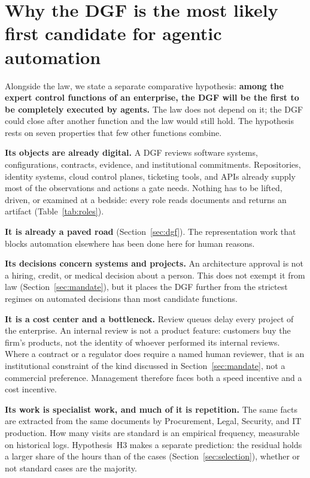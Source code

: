 \section{Why the DGF is the most likely first candidate for agentic automation}
\label{sec:candidate}

Alongside the law, we state a separate comparative hypothesis: \textbf{among the expert control
functions of an enterprise, the DGF will be the first to be completely executed by agents.} The law
does not depend on it; the DGF could close after another function and the law would still hold. The
hypothesis rests on seven properties that few other functions combine.

\textbf{Its objects are already digital.} A DGF reviews software systems, configurations, contracts,
evidence, and institutional commitments. Repositories, identity systems, cloud control planes, ticketing
tools, and APIs already supply most of the observations and actions a gate needs. Nothing has to be lifted, driven, or examined at a bedside: every role reads documents and returns an
artifact (Table~\ref{tab:roles}).

\textbf{It is already a paved road} (Section~\ref{sec:dgf}). The representation work that blocks
automation elsewhere has been done here for human reasons.

\textbf{Its decisions concern systems and projects.} An architecture approval is not a hiring, credit,
or medical decision about a person. This does not exempt it from law (Section~\ref{sec:mandate}), but it
places the DGF further from the strictest regimes on automated decisions than most candidate functions.

\textbf{It is a cost center and a bottleneck.} Review queues delay every project of the enterprise. An internal review is not
a product feature: customers buy the firm's products, not the identity of whoever performed its
internal reviews. Where a contract or a regulator does require a named human reviewer, that is an
institutional constraint of the kind discussed in Section~\ref{sec:mandate}, not a commercial
preference. Management therefore faces both a speed incentive and a cost incentive.

\textbf{Its work is specialist work, and much of it is repetition.} The same facts are extracted from the
same documents by Procurement, Legal, Security, and IT production. How many visits are standard is an empirical frequency, measurable on historical logs. Hypothesis~H3
makes a separate prediction: the residual holds a larger share of the hours than of the cases
(Section~\ref{sec:selection}), whether or not standard cases are the majority.

